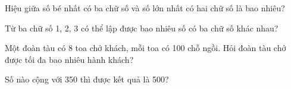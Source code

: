 \begin{ex}
Hiệu giữa số bé nhất có ba chữ số và số lớn nhất có hai chữ số là bao nhiêu?
\end{ex}

\begin{ex}
Từ ba chữ số 1, 2, 3 có thể lập được bao nhiêu số có ba chữ số khác nhau?
\end{ex}

\begin{ex}
Một đoàn tàu có 8 toa chở khách, mỗi toa có 100 chỗ ngồi. Hỏi đoàn tàu chở được tối đa bao nhiêu hành khách?
\end{ex}

\begin{ex}
Số nào cộng với 350 thì được kết quả là 500?
\end{ex}
